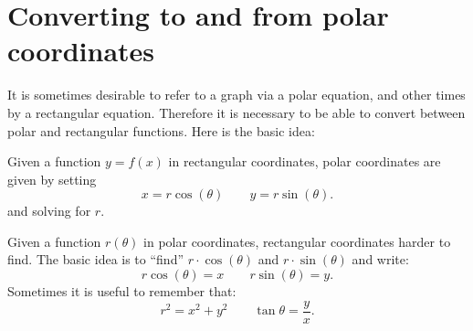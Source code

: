 \documentclass{ximera}
\begin{document}
\begin{example}
\begin{explanation}
       
       \begin{image}%
        \qquad
       \end{image}
  \end{explanation}
\end{example}


\section{Converting to and from polar coordinates}


It is sometimes desirable to refer to a graph via a polar equation,
and other times by a rectangular equation.  Therefore it is necessary
to be able to convert between polar and rectangular functions.  Here
is the basic idea:

Given a function $y=f(x)$ in rectangular coordinates, polar coordinates
are given by setting
\[
x=r\cos(\theta)\qquad y=r\sin(\theta).
\]
and solving for $r$.

Given a function $r(\theta)$ in polar coordinates, rectangular
coordinates harder to find. The basic idea is to ``find'' $r\cdot
\cos(\theta)$ and $r\cdot \sin(\theta)$ and write:
\[
r\cos(\theta) = x\qquad r\sin(\theta) = y.
\]
Sometimes it is useful to remember that:
\[
r^2=x^2+y^2\qquad \tan \theta = \frac yx.
\]
\end{document}
